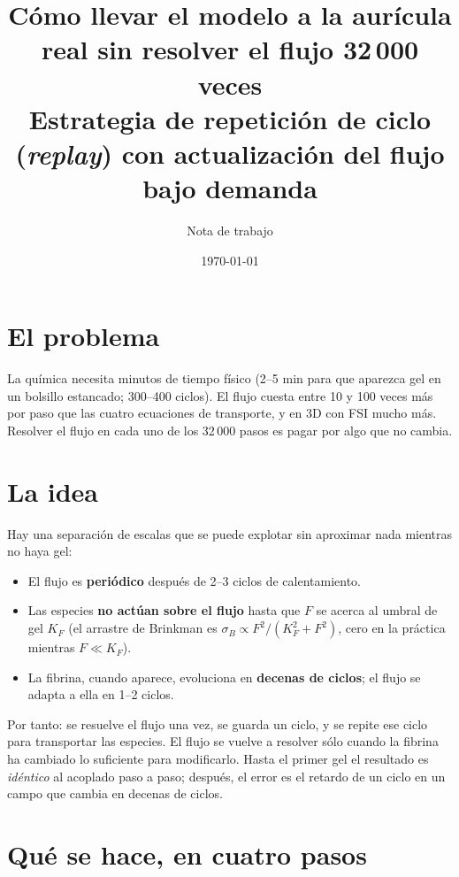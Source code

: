 \documentclass[11pt,a4paper]{article}
\title{\vspace{-1.5em}Cómo llevar el modelo a la aurícula real sin resolver el flujo 32\,000 veces\\[3pt]
\large Estrategia de repetición de ciclo (\emph{replay}) con actualización del flujo bajo demanda}
\author{Nota de trabajo}
\date{\today}
\begin{document}
\maketitle

\section{El problema}

La química necesita minutos de tiempo físico (2--5 min para que aparezca gel en un bolsillo estancado; 300--400 ciclos). El flujo cuesta entre 10 y 100 veces más por paso que las cuatro ecuaciones de transporte, y en 3D con FSI mucho más. Resolver el flujo en cada uno de los 32\,000 pasos es pagar por algo que no cambia.

\section{La idea}

Hay una separación de escalas que se puede explotar sin aproximar nada mientras no haya gel:
\begin{itemize}[leftmargin=1.4em]
\item El flujo es \textbf{periódico} después de 2--3 ciclos de calentamiento.
\item Las especies \textbf{no actúan sobre el flujo} hasta que $F$ se acerca al umbral de gel $K_F$ (el arrastre de Brinkman es $\sigma_B\propto F^2/(K_F^2+F^2)$, cero en la práctica mientras $F\ll K_F$).
\item La fibrina, cuando aparece, evoluciona en \textbf{decenas de ciclos}; el flujo se adapta a ella en 1--2 ciclos.
\end{itemize}
Por tanto: se resuelve el flujo una vez, se guarda un ciclo, y se repite ese ciclo para transportar las especies. El flujo se vuelve a resolver sólo cuando la fibrina ha cambiado lo suficiente para modificarlo. Hasta el primer gel el resultado es \emph{idéntico} al acoplado paso a paso; después, el error es el retardo de un ciclo en un campo que cambia en decenas de ciclos.

\section{Qué se hace, en cuatro pasos}
\end{document}
